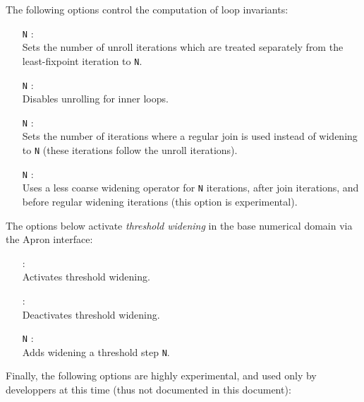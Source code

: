 The following options control the computation of loop invariants:
\begin{itemize}
\item[\doption{-unrolls} \texttt{N}]: \\
  Sets the number of unroll iterations which are treated separately
  from the least-fixpoint iteration to \texttt{N}.
\item[\doption{-no-unroll-in} \texttt{N}]: \\
  Disables unrolling for inner loops.
\item[\doption{-j-iters} \texttt{N}]: \\
  Sets the number of iterations where a regular join is used instead
  of widening to \texttt{N} (these iterations follow the unroll
  iterations).
\item[\doption{-dw-iters} \texttt{N}] \optdev: \\
  Uses a less coarse widening operator for \texttt{N} iterations, after
  join iterations, and before regular widening iterations (this option
  is experimental).
\end{itemize}

The options below activate {\em threshold widening} in the base
numerical domain via the Apron interface:
\begin{itemize}
\item[\doption{-w-thr}]: \\
  Activates threshold widening.
\item[\doption{-w-no-thr}]: \\
  Deactivates threshold widening.
\item[\doption{-w-add-thr} \texttt{N}]: \\
  Adds widening a threshold step \texttt{N}.
\end{itemize}

Finally, the following options are highly experimental, and used only
by developpers at this time (thus not documented in this document):
\begin{itemize}
\item[\doption{-type-unfolds}] \optdev
\item[\doption{-part-lfps}] \optdev
\item[\doption{-no-part-lfps}] \optdev
\item[\doption{-sel-widen}] \optdev
\item[\doption{-no-sel-widen}] \optdev
\item[\doption{-basic-widen}] \optdev
\item[\doption{-no-basic-widen}] \optdev
\item[\doption{-no-fast-iir}] \optdev
\item[\doption{-unary-abs}] \optdev
\item[\doption{-no-unary-abs}] \optdev
\item[\doption{-rec-calls}] \optdev
\end{itemize}


